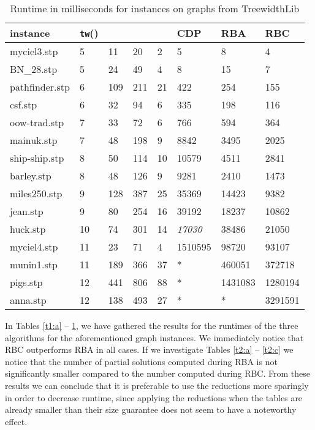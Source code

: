 \documentclass{llncs}
\begin{document}
\begin{table}[!h]
\begin{center}
\begin{tabular}{l l l l l | l l l }
\hline
instance & \texttt{tw}() &  &  &  & CDP & RBA & RBC\\
\hline
\hline
myciel3.stp	&	5	&	11	&	20	&	2	&	5	&	8	&	4	\\
BN\_28.stp	&	5	&	24	&	49	&	4	&	8	&	15	&	7	\\
pathfinder.stp	&	6	&	109	&	211	&	21	&	422	&	254	&	155	\\
csf.stp	&	6	&	32	&	94	&	6	&	335	&	198	&	116	\\
oow-trad.stp	&	7	&	33	&	72	&	6	&	766	&	594	&	364	\\
mainuk.stp	&	7	&	48	&	198	&	9	&	8842	&	3495	&	2025	\\
ship-ship.stp	& 	8	&	50	&	114	&	10	&	10579	&	4511	&	2841	\\
barley.stp	&	8	&	48	&	126	&	9	&	9281	&	2410	&	1473	\\
miles250.stp	&	9	&	128	&	387	&	25	&	35369	&	14423	&	9382	\\
jean.stp	&	9	&	80	&	254	&	16	&	39192	&	18237	&	10862	\\
huck.stp	&	10	&	74	&	301	&	14	&	\textit{17030}	&	38486	&	21050	\\
myciel4.stp	&	11	&	23	&	71	&	4	&	1510595	&	98720		&	93107 \\
munin1.stp	&	11	&	189	&	366	&	37	&	*	&	460051	&	372718 \\
pigs.stp	&	12	&	441	&	806	&	88	&	*	&	1431083	&	1280194 \\
anna.stp	&	12	&	138	&	493	&	27	&	*	&	*	&	3291591 \\
\hline
\end{tabular}
\end{center}
\caption{Runtime in milliseconds for instances on graphs from TreewidthLib}
\label{t1:c}
\end{table}


In Tables \ref{t1:a} -- \ref{t1:c}, we have gathered the results for the runtimes of the three algorithms for the aforementioned graph instances. 
We immediately notice that RBC outperforms RBA in all cases.
If we investigate Tables \ref{t2:a} -- \ref{t2:c} we notice
that the number of partial solutions computed during RBA is not significantly smaller compared to the number computed during RBC. From these results we can conclude that it is preferable to use the reductions more sparingly in order to decrease runtime, since applying the reductions when the tables are already smaller than their size guarantee does not seem to have a noteworthy effect.
\end{document}
